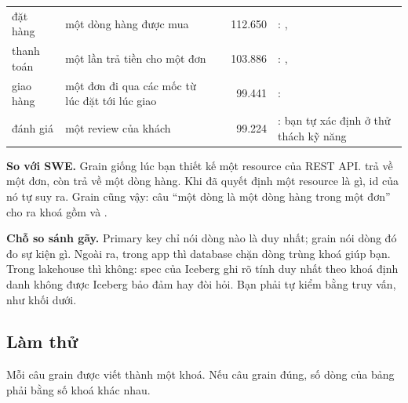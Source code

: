 \begin{xltabular}{\textwidth}{@{}P{2.1cm} L P{2.6cm} r P{4.2cm}@{}}
\toprule
{} &  &  &  &  \\
\midrule
\endhead
\bottomrule
\endfoot
đặt hàng & một dòng hàng được mua &  & 112.650 & : ,  \\
thanh toán & một lần trả tiền cho một đơn &  & 103.886 & : ,  \\
giao hàng & một đơn đi qua các mốc từ lúc đặt tới lúc giao &  & 99.441 & :  \\
đánh giá & một review của khách &  & 99.224 & : bạn tự xác định ở thử thách kỹ năng \\
\end{xltabular}

\begin{ghichu}
\textbf{So với SWE.} Grain giống lúc bạn thiết kế một resource của REST API.  trả về một đơn, còn  trả về một dòng hàng. Khi đã quyết định một resource là gì, id của nó tự suy ra. Grain cũng vậy: câu ``một dòng là một dòng hàng trong một đơn'' cho ra khoá gồm  và .

\textbf{Chỗ so sánh gãy.} Primary key chỉ nói dòng nào là duy nhất; grain nói dòng đó đo sự kiện gì. Ngoài ra, trong app thì database chặn dòng trùng khoá giúp bạn. Trong lakehouse thì không: spec của Iceberg ghi rõ tính duy nhất theo khoá định danh không được Iceberg bảo đảm hay đòi hỏi. Bạn phải tự kiểm bằng truy vấn, như khối dưới.
\end{ghichu}

\subsection{Làm thử}

Mỗi câu grain được viết thành một khoá. Nếu câu grain đúng, số dòng của bảng phải bằng số khoá khác nhau.

